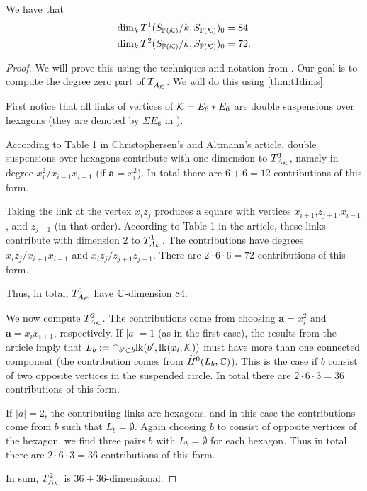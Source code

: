 \begin{proposition}
We have that
\begin{align*}
\dim_k T^1(S_{\mathbb{P}(\mathcal{K})}/k,S_{\mathbb{P}(\mathcal{K})})_0 &= 84 \\
\dim_k T^2(S_{\mathbb{P}(\mathcal{K})}/k,S_{\mathbb{P}(\mathcal{K})})_0 &= 72. \\
\end{align*}
\end{proposition}
\begin{proof}
We will prove this using the techniques and notation from \cite{deforming_christophersen}. Our goal is to compute the degree zero part of $T^1_{A_{\mathcal{K}}}$. We will do this using \cref{thm:t1dims}.

First notice that all links of vertices of $\mathcal{K}=E_6 \ast E_6$ are double suspensions over hexagons (they are denoted by $\Sigma E_6$ in \cite{deforming_christophersen}).

According to Table 1 in Christophersen's and Altmann's article, double suspensions over hexagons contribute with one dimension to $T^1_{A_{\mathcal{K}}}$, namely in degree $x_i^2/x_{i-1}x_{i+1}$ (if $\mathbf a =x_i^2$). In total there are $6+6=12$ contributions of this form.

Taking the link at the vertex $x_iz_j$ produces a square with vertices $x_{i+1}$,$z_{j+1}$,$x_{i-1}$, and $z_{j-1}$ (in that order). According to Table 1 in the article, these links contribute with dimension $2$ to $T^1_{A_{\mathcal{K}}}$. The contributions have degrees $x_iz_j/x_{i+1}x_{i-1}$ and $x_iz_j/z_{j+1}z_{j-1}$. There are $2 \cdot 6 \cdot 6=72$ contributions of this form.

Thus, in total, $T^1_{A_{\mathcal{K}}}$ have $\mathbb{C}$-dimension $84$.

We now compute $T^2_{A_{\mathcal{K}}}$. The contributions come from choosing $\mathbf a=x_i^2$ and $\mathbf a=x_ix_{i+1}$, respectively. If $|a|=1$ (as in the first case), the results from the article imply that $L_b := \cap_{b' \subset b} \mathrm{lk}(b',\mathrm{lk}(x_i,\mathcal{K}))$ must have more than one connected component (the contribution comes from $\widetilde H^0(L_b,\mathbb{C})$). This is the case if $b$ consist of two opposite vertices in the suspended circle. In total there are $2 \cdot 6 \cdot 3=36$ contributions of this form. 

If $|a|=2$, the contributing links are hexagons, and in this case the contributions come from $b$ such that $L_b=\emptyset$. Again choosing $b$ to consist of opposite vertices of the hexagon, we find three pairs $b$ with $L_b=\emptyset$ for each hexagon. Thus in total there are $2 \cdot 6 \cdot 3=36$ contributions of this form.

In sum, $T^2_{A_{\mathcal{K}}}$ is $36+36$-dimensional.
\end{proof}

